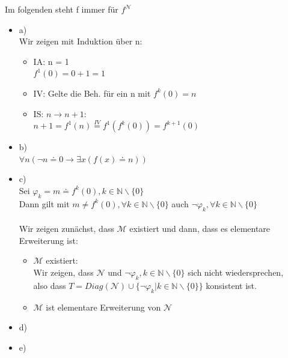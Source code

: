 \documentclass[a4paper]{scrartcl}%
\begin{document}
    Im folgenden steht f immer für $f^\mathcal{N}$
    \begin{itemize}
        \item a)\\
            Wir zeigen mit Induktion über n:\\
            \begin{itemize}
                \item IA: n = 1\\
                    $f^1(0) = 0 + 1 = 1$\\
                \item IV: Gelte die Beh. für ein n mit $f^k(0) = n$\\
                \item IS: $n \rightarrow n+1$:\\
                    $n + 1 = f^1(n) \overset{IV}{=} f^1(f^k(0)) = f^{k+1}(0)$\\
            \end{itemize}
        \item b)\\
            $\forall n (\neg n \doteq 0 \rightarrow \exists x(f(x) \doteq n))$\\
        \item c)\\
            Sei $\varphi_k = m \doteq f^k(0), k \in \mathds{N}\backslash\{0\}$\\
            Dann gilt mit $m \neq f^k(0), \forall k \in \mathds{N}\backslash\{0\}$ auch $\neg \varphi_k, \forall k \in \mathds{N}\backslash\{0\}$\\
            \\Wir zeigen zunächst, dass $\mathcal{M}$ existiert und dann, dass es elementare Erweiterung ist:\\
            \begin{itemize}
                \item $\mathcal{M}$ existiert:\\
                    Wir zeigen, dass $\mathcal{N}$ und $\neg \varphi_k, k \in \mathds{N}\backslash\{0\}$ sich nicht wiedersprechen,\\
                    also dass $T = Diag(\mathcal{N}) \cup \{\neg \varphi_k | k \in \mathds{N}\backslash\{0\}\}$ konsistent ist.\\
                \item $\mathcal{M}$ ist elementare Erweiterung von $\mathcal{N}$\\
            \end{itemize}
        \item d)\\
        \item e)\\
    \end{itemize}
\end{document}
